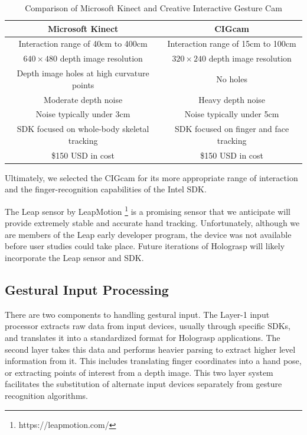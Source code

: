 \documentclass[pageno]{jpaper}
\begin{document}
\begin{table}[h]
\begin{tabular}{|c|c|}
\hline
{\bf Microsoft Kinect} & {\bf CIGcam} \\ \hline
Interaction range of 40cm to 400cm & Interaction range of 15cm to 100cm \\
$640 \times 480$ depth image resolution & $320 \times 240$ depth image resolution \\
Depth image holes at high curvature points & No holes \\
Moderate depth noise & Heavy depth noise \\
Noise typically under 3cm & Noise typically under 5cm \\
SDK focused on whole-body skeletal tracking & SDK focused on finger and face tracking \\
\$150 USD in cost & \$150 USD in cost \\
\hline
\end{tabular}
\caption{Comparison of Microsoft Kinect and Creative Interactive Gesture Cam}
\label{tab:comparison}
\end{table}

Ultimately, we selected the CIGcam for its more appropriate range of interaction and the finger-recognition
capabilities of the Intel SDK.

The Leap sensor by LeapMotion \footnote{https://leapmotion.com/} is a promising sensor that we anticipate will provide extremely stable and
accurate hand tracking. Unfortunately, although we are members of the Leap early developer program, the device was not available
before user studies could take place. Future iterations of Holograsp will likely incorporate the Leap sensor and SDK.

\subsection{Gestural Input Processing}
There are two components to handling gestural input. The Layer-1 input processor extracts raw data from input devices, usually through specific
SDKs, and translates it into a standardized format for Holograsp applications. The second layer takes this data and performs heavier
parsing to extract higher level information from it. This includes translating finger coordinates into a hand pose, or extracting
points of interest from a depth image. This two layer system facilitates the substitution of alternate input devices separately from
gesture recognition algorithms.
\end{document}
